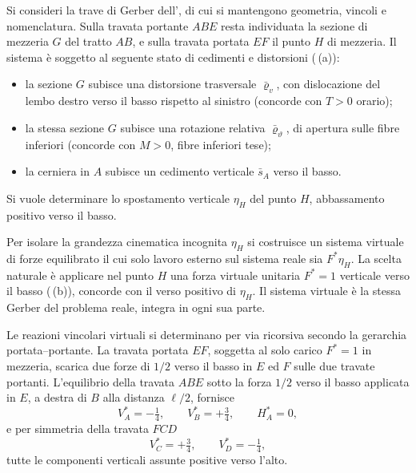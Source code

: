 \begin{esempio}
	\label{subsec:TFV_gerber}
	
	Si consideri la trave di Gerber dell',
	di cui si mantengono geometria, vincoli e nomenclatura. Sulla 
	travata portante $ABE$ resta individuata la sezione di mezzeria 
	$G$ del tratto $AB$, e sulla travata portata $EF$ il punto $H$ 
	di mezzeria. Il sistema è soggetto al seguente stato di
	cedimenti e distorsioni (\,(a)):
	\begin{itemize}[noitemsep,topsep=2pt]
		\item la sezione $G$ subisce una distorsione trasversale 
		$\bar\varrho_v$, con dislocazione del lembo destro verso il 
		basso rispetto al sinistro (concorde con $T>0$ orario);
		\item la stessa sezione $G$ subisce una rotazione relativa 
		$\bar\varrho_\vartheta$, di apertura sulle fibre inferiori 
		(concorde con $M>0$, fibre inferiori tese);
		\item la cerniera in $A$ subisce un cedimento verticale 
		$\bar s_A$ verso il basso.
	\end{itemize}
	Si vuole determinare lo spostamento verticale $\eta_H$ del punto 
	$H$, abbassamento positivo verso il basso.
	
	\begin{svolgimento}
		
		Per isolare la grandezza cinematica incognita $\eta_H$ si costruisce 
		un sistema virtuale di forze equilibrato il cui solo lavoro esterno 
		sul sistema reale sia $F^{*}\eta_H$. La scelta naturale è applicare 
		nel punto $H$ una forza virtuale unitaria $F^{*}=1$ verticale verso 
		il basso (\,(b)), concorde con il verso 
		positivo di $\eta_H$. Il sistema virtuale è la stessa Gerber del 
		problema reale, integra in ogni sua parte.
		
		Le reazioni vincolari virtuali si determinano per via ricorsiva 
		secondo la gerarchia portata--portante. La travata portata $EF$, 
		soggetta al solo carico $F^{*}=1$ in mezzeria, scarica due forze 
		di $1/2$ verso il basso in $E$ ed $F$ sulle due travate portanti. 
		L'equilibrio della travata $ABE$ sotto la forza $1/2$ verso il basso 
		applicata in $E$, a destra di $B$ alla distanza $\ell/2$, fornisce
		\begin{equation*}
			V_A^{*} = -\tfrac{1}{4}, \qquad V_B^{*} = +\tfrac{3}{4}, 
			\qquad H_A^{*} = 0,
		\end{equation*}
		e per simmetria della travata $FCD$
		\begin{equation*}
			V_C^{*} = +\tfrac{3}{4}, \qquad V_D^{*} = -\tfrac{1}{4},
		\end{equation*}
		tutte le componenti verticali assunte positive verso l'alto.
		

\end{svolgimento}
\end{esempio}

